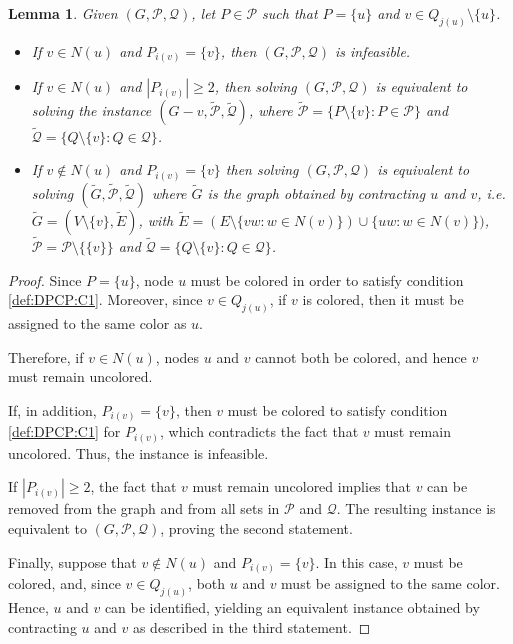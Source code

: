 \documentclass[preprint, 11pt, authoryear]{elsarticle}
\newtheorem{lemma}{Lemma}[section]
\newcommand{\PP}{{\mathcal P}}
\newcommand{\QQ}{{\mathcal Q}}
\begin{document}
\begin{lemma}
\label{th:singletons}
Given $(G,\PP,\QQ)$, let $P\in\PP$ such that $P=\{u\}$ and $v \in  Q_{j(u)}\setminus \{u\}$.

\begin{itemize}
\item If $v\in N(u)$ and $P_{i(v)}=\{v\}$, then $(G,\PP,\QQ)$ is infeasible. 

\item If $v\in N(u)$ and  $|P_{i(v)}|\geq 2$,  then solving $(G,\PP,\QQ)$ is equivalent to solving the instance $(G-v,\tilde \PP, \tilde \QQ)$, where 
$
\tilde \PP= \{P\setminus \{v\}: P\in \PP\}$ and $\tilde \QQ= \{Q\setminus \{v\}: Q\in \QQ\}$.

\item If $v\notin N(u)$ and $P_{i(v)}=\{v\}$ then solving $(G,\PP,\QQ)$ is equivalent to solving $(\tilde  G,\tilde\PP,\tilde \QQ)$    where $\tilde G$ is the graph obtained by contracting $u$ and  $v$, i.e. $\tilde G=(V\setminus \{v\}, \tilde  E)$, with $\tilde E=(E\setminus \{vw: w\in N(v)\}) \cup \{uw: w\in N(v)\})$,  
 $\tilde \PP=\PP\setminus \{\{v\}\}$ and $\tilde \QQ= \{Q\setminus \{v\}: Q\in \QQ\}$.
        
\end{itemize}
\end{lemma}


\begin{proof}
Since $P=\{u\}$, node $u$ must be colored in order to satisfy condition \ref{def:DPCP:C1}. Moreover, since $v\in Q_{j(u)}$, if $v$ is colored, then it must be assigned to the same color as $u$. 

Therefore, if $v\in N(u)$, nodes $u$ and $v$ cannot both be colored, and hence $v$ must remain uncolored.
    
If, in addition, $P_{i(v)}=\{v\}$, then $v$ must be colored to satisfy condition \ref{def:DPCP:C1} for $P_{i(v)}$, which contradicts the fact that $v$ must remain uncolored. Thus, the instance is infeasible.

If $|P_{i(v)}|\geq 2$, the fact that $v$ must remain uncolored implies that $v$ can be removed from the graph and from all sets in $\PP$ and $\QQ$. The resulting instance is equivalent to $(G,\PP,\QQ)$, proving the second statement.

Finally, suppose that $v\notin N(u)$ and $P_{i(v)}=\{v\}$. In this case, $v$ must be colored, and, since $v\in Q_{j(u)}$, both $u$ and $v$ must be assigned to the same color. Hence, $u$ and $v$ can be identified, yielding an equivalent instance obtained by contracting $u$ and $v$ as described in the third statement.
\end{proof}
\end{document}
